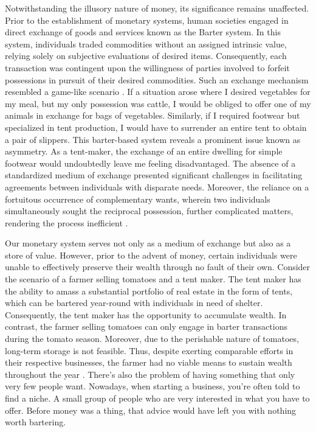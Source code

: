 Notwithstanding the illusory nature of money, its significance remains unaffected. Prior to the establishment of monetary systems, human societies engaged
in direct exchange of goods and services known as the Barter system. In this system, individuals traded commodities without an assigned intrinsic value,
relying solely on subjective evaluations of desired items. Consequently, each transaction was contingent upon the willingness of parties involved to forfeit
possessions in pursuit of their desired commodities. Such an exchange mechanism resembled a game-like scenario \cite{durlauf2016new}. If a situation arose where I desired vegetables for my meal, but my only possession was cattle, I would be obliged to offer one of my animals in exchange for bags of vegetables. Similarly, if I required footwear but specialized in tent production, I would have to surrender an entire tent to obtain a pair of slippers. This barter-based system reveals a prominent issue known as asymmetry. As a tent-maker, the exchange of an entire dwelling for simple footwear would undoubtedly leave me feeling disadvantaged. The absence of a standardized medium of exchange presented significant challenges in facilitating agreements between individuals with disparate needs. Moreover, the reliance on a fortuitous occurrence of complementary wants, wherein two individuals simultaneously sought the reciprocal possession, further complicated matters, rendering the process inefficient \cite{goodhart1998two}.

Our monetary system serves not only as a medium of exchange but also as a store of value. However, prior to the advent of money, certain individuals were
unable to effectively preserve their wealth through no fault of their own. Consider the scenario of a farmer selling tomatoes and a tent maker. The tent
maker has the ability to amass a substantial portfolio of real estate in the form of tents, which can be bartered year-round with individuals in need of
shelter. Consequently, the tent maker has the opportunity to accumulate wealth. In contrast, the farmer selling tomatoes can only engage in barter
transactions during the tomato season. Moreover, due to the perishable nature of tomatoes, long-term storage is not feasible. Thus, despite exerting
comparable efforts in their respective businesses, the farmer had no viable means to sustain wealth throughout the year \cite{de2016origins}. There's also the problem of having something that only very few people want. Nowadays, when starting a business, you're often told to find a niche. A small group of people who are very interested in what you have to offer. Before money was a thing, that advice would have left you with nothing worth bartering.

